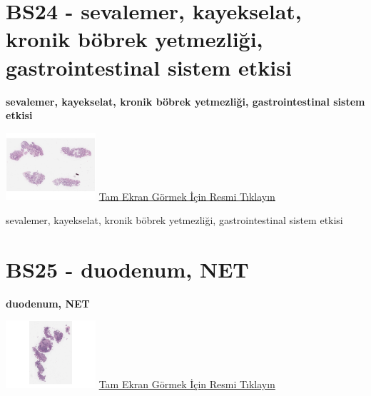 \documentclass[
  letterpaper,
  DIV=11,
  numbers=noendperiod]{scrreprt}
\begin{document}
\hypertarget{sec-BS24}{%
\section{BS24 - sevalemer, kayekselat, kronik böbrek yetmezliği,
gastrointestinal sistem etkisi}\label{sec-BS24}}

\textbf{sevalemer, kayekselat, kronik böbrek yetmezliği,
gastrointestinal sistem etkisi}

\href{https://images.patolojiatlasi.com/BS24/HE.html}{\includegraphics[width=0.25\textwidth,height=\textheight]{./screenshots/BS24-HE_screenshot.png}}
\href{https://images.patolojiatlasi.com/BS24/HE.html}{Tam Ekran Görmek
İçin Resmi Tıklayın}

\begin{tcolorbox}[enhanced jigsaw, left=2mm, toprule=.15mm, rightrule=.15mm, bottomrule=.15mm, leftrule=.75mm, colback=white, colframe=quarto-callout-tip-color-frame, toptitle=1mm, breakable, titlerule=0mm, colbacktitle=quarto-callout-tip-color!10!white, bottomtitle=1mm, title=\textcolor{quarto-callout-tip-color}{\faLightbulb}\hspace{0.5em}{Tanı}, arc=.35mm, opacitybacktitle=0.6, opacityback=0, coltitle=black]

sevalemer, kayekselat, kronik böbrek yetmezliği, gastrointestinal sistem
etkisi

\end{tcolorbox}

\hypertarget{sec-BS25}{%
\section{BS25 - duodenum, NET}\label{sec-BS25}}

\textbf{duodenum, NET}

\href{https://images.patolojiatlasi.com/BS25/HE.html}{\includegraphics[width=0.25\textwidth,height=\textheight]{./screenshots/BS25-HE_screenshot.png}}
\href{https://images.patolojiatlasi.com/BS25/HE.html}{Tam Ekran Görmek
İçin Resmi Tıklayın}
\end{document}
